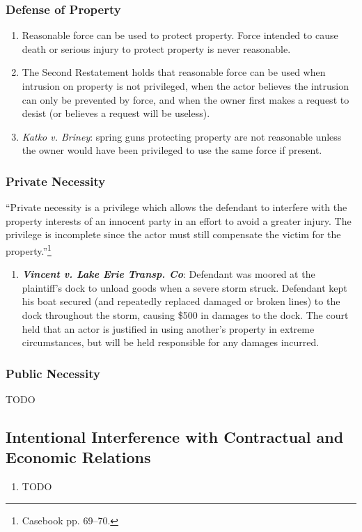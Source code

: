 \subsubsection{Defense of Property}

\begin{enumerate}
    \item Reasonable force can be used to protect property. Force intended to cause death or serious injury to protect property is never reasonable.
    \item The Second Restatement holds that reasonable force can be used when intrusion on property is not privileged, when the actor believes the intrusion can only be prevented by force, and when the owner first makes a request to desist (or believes a request will be useless).
    \item \emph{Katko v. Briney}: spring guns protecting property are not reasonable unless the owner would have been privileged to use the same force if present.
\end{enumerate}

\subsubsection{Private Necessity}

``Private necessity is a privilege which allows the defendant to interfere with the property interests of an innocent party in an effort to avoid a greater injury. The privilege is incomplete since the actor must still compensate the victim for the property.''\footnote{Casebook pp. 69--70.}

\begin{enumerate}
    \item \textbf{\emph{Vincent v. Lake Erie Transp. Co}}: Defendant was moored at the plaintiff's dock to unload goods when a severe storm struck. Defendant kept his boat secured (and repeatedly replaced damaged or broken lines) to the dock throughout the storm, causing \$500 in damages to the dock. The court held that an actor is justified in using another's property in extreme circumstances, but will be held responsible for any damages incurred.
\end{enumerate}

\subsubsection{Public Necessity}

TODO

\subsection{Intentional Interference with Contractual and Economic Relations}

\begin{enumerate}
    \item TODO
\end{enumerate}
